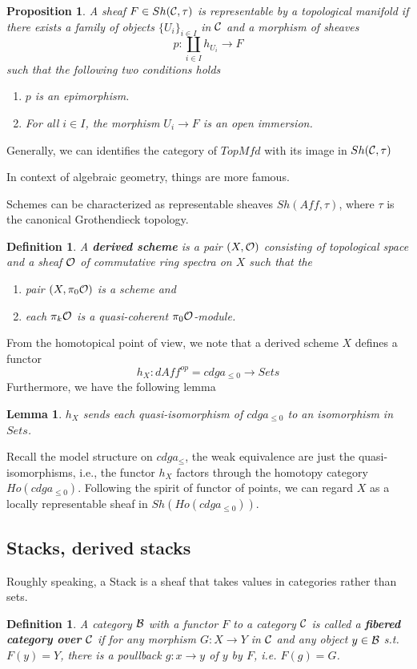 \documentclass[11pt]{article}
\newtheorem{prop}[thm]{Proposition}
\newtheorem{lemma}[thm]{Lemma}
\newtheorem{dfn}[thm]{Definition}
\newcommand{\calb}{{\cal B}}
\newcommand{\calc}{{\cal C}}
\newcommand{\calo}{{\cal O}}
\newcommand{\lrta}{\longrightarrow}
\begin{document}
\begin{prop}
A sheaf $F\in Sh(\calc,\tau)$ is representable by a topological manifold if there exists a family of objects $\{U_i\}_{i\in I}$ in $\calc$ and a morphism of sheaves
$$
p:\coprod_{i\in I}h_{U_i}\lrta F
$$
such that the following two conditions holds
\begin{enumerate}
\item $p$ is an epimorphism.
\item For all $i\in I$, the morphism $U_i\lrta F$ is an open immersion.
\end{enumerate}
\end{prop}

Generally, we can identifies the category of $TopMfd$ with its image in $Sh(\calc,\tau)$

In context of algebraic geometry, things are more famous.

Schemes can be characterized as representable sheaves $Sh(Aff,\tau)$, where $\tau$ is the canonical Grothendieck topology.



\begin{dfn}
A \textbf{derived scheme} is a pair $(X,\calo)$ consisting of topological space and a sheaf $\calo$ of commutative ring spectra on $X$ such that the
\begin{enumerate}
\item pair $(X,\pi_0\calo)$ is a scheme and 
\item each $\pi_k\calo$ is a quasi-coherent $\pi_0\calo$-module.
\end{enumerate}
\end{dfn}

From the homotopical point of view, we note that a derived scheme $X$ defines a functor
$$
h_X: dAff^{op}=cdga_{\leq 0}\lrta Sets
$$
Furthermore,  we have the following lemma
\begin{lemma}
$h_X$ sends each quasi-isomorphism of $cdga_{\leq 0}$ to an isomorphism in $Sets$.
\end{lemma}

Recall the model structure on $cdga_{\leq}$, the weak equivalence are just the quasi-isomorphisms, i.e., the functor $h_X$ factors through the homotopy category $Ho(cdga_{\leq 0})$. Following the spirit of functor of points, we can regard $X$ as 
a locally representable sheaf in $Sh(Ho(cdga_{\leq 0}))$.
\subsection{Stacks, derived stacks}
Roughly speaking, a Stack is a sheaf that takes values in categories rather than sets.
\begin{dfn}
A category $\calb$ with a functor $F$ to a category $\calc$ is called a \textbf{fibered category over $\calc$} if for any morphism $G:X\lrta Y$ in $\calc$ and any object $y\in\calb$ s.t. $F(y)=Y$, there is a poullback $g: x\lrta y$ of $y$ by $F$, i.e. $F(g)=G$.
\end{dfn}
\end{document}
